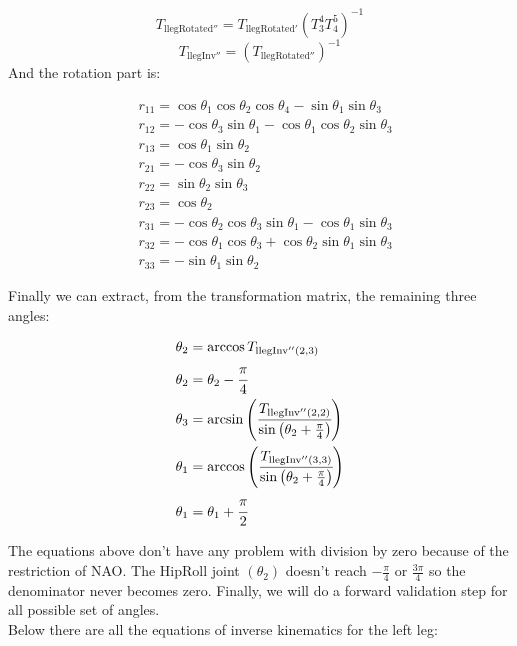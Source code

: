 \[
T_{\text{llegRotated}''} = T_{\text{llegRotated}'}\left(T^4_3T^5_4\right)^{-1}
\]
\[
T_{\text{llegInv}''} = \left(T_{\text{llegRotated}''}\right)^{-1}
\]
And the rotation part is:
\begin{small}
\begin{align*}
&r_{11} = \cos\theta_1\cos\theta_2\cos\theta_4 - \sin\theta_1\sin\theta_3\\
&r_{12} = -\cos\theta_3\sin\theta_1 - \cos\theta_1\cos\theta_2\sin\theta_3\\
&r_{13} = \cos\theta_1\sin\theta_2 \\
&r_{21} = -\cos\theta_3\sin\theta_2\\
&r_{22} = \sin\theta_2\sin\theta_3\\
&r_{23} = \cos\theta_2\\
&r_{31} = -\cos\theta_2\cos\theta_3\sin\theta_1 - \cos\theta_1\sin\theta_3\\
&r_{32} = -\cos\theta_1\cos\theta_3 + \cos\theta_2\sin\theta_1\sin\theta_3\\
&r_{33} = -\sin\theta_1\sin\theta_2
\end{align*}
\end{small}
Finally we can extract, from the transformation matrix, the remaining three angles:
\begin{small}
\begin{align*}
\theta_2 &= \arccos T_{\text{llegInv}''(2,3)}\\
\theta_2 &= \theta_2 - \cfrac{\pi}{4}\\
\theta_3 &= \arcsin\left(\cfrac{T_{\text{llegInv}''(2,2)}}{\sin\left(\theta_2+\frac{\pi}{4}\right)}\right)\\
\theta_1 &= \arccos\left(\cfrac{T_{\text{llegInv}''(3,3)}}{\sin\left(\theta_2+\frac{\pi}{4}\right)}\right)\\
\theta_1 &= \theta_1 + \cfrac{\pi}{2}
\end{align*}
\end{small}
The equations above don't have any problem with division by zero because of the restriction of NAO. The HipRoll joint \((\theta_2)\) doesn't reach \(-\frac{\pi}{4}\) or \(\frac{3\pi}{4}\) so the denominator never becomes zero. Finally, we will do a forward validation step for all possible set of angles.\\
Below there are all the equations of inverse kinematics for the left leg:
